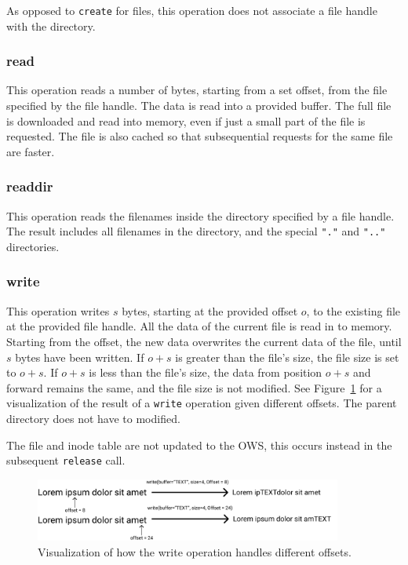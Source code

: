 As opposed to \texttt{create} for files, this operation does not associate a file handle with the directory.

\subsubsection{read}
This operation reads a number of bytes, starting from a set offset, from the file specified by the file handle. The data is read into a provided buffer. The full file is downloaded and read into memory, even if just a small part of the file is requested. The file is also cached so that subsequential requests for the same file are faster. 

\subsubsection{readdir}
This operation reads the filenames inside the directory specified by a file handle. The result includes all filenames in the directory, and the special \texttt{"."} and \texttt{".."} directories.

\subsubsection{write}
This operation writes $s$ bytes, starting at the provided offset $o$, to the existing file at the provided file handle. All the data of the current file is read in to memory. Starting from the offset, the new data overwrites the current data of the file, until $s$ bytes have been written. If $o + s$ is greater than the file's size, the file size is set to $o + s$. If $o + s$ is less than the file's size, the data from position $o + s$ and forward remains the same, and the file size is not modified. See Figure~\ref{fig:write_flow} for a visualization of the result of a \texttt{write} operation given different offsets. The parent directory does not have to modified. 

The file and inode table are not updated to the OWS, this occurs instead in the subsequent \texttt{release} call.

\begin{figure}[!ht]
	\begin{center}
	  \includegraphics[width=0.9\textwidth]{figures/write_flow.png}
	\end{center}
	\caption{Visualization of how the write operation handles different offsets.}
	\label{fig:write_flow}
\end{figure}

